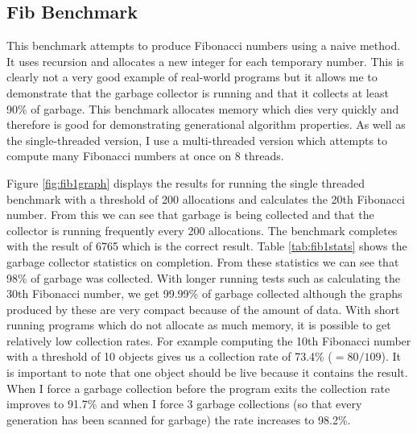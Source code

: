 \documentclass[../diss.tex]{subfiles}
\begin{document}
\subsection{Fib Benchmark}

This benchmark attempts to produce Fibonacci numbers using a naive method. It uses recursion and allocates a new integer for each temporary number. This is clearly not a very good example of real-world programs but it allows me to demonstrate that the garbage collector is running and that it collects at least 90\% of garbage. This benchmark allocates memory which dies very quickly and therefore is good for demonstrating generational algorithm properties. As well as the single-threaded version, I use a multi-threaded version which attempts to compute many Fibonacci numbers at once on 8 threads.

Figure \ref{fig:fib1graph} displays the results for running the single threaded benchmark with a threshold of 200 allocations and calculates the 20th Fibonacci number. From this we can see that garbage is being collected and that the collector is running frequently every 200 allocations. The benchmark completes with the result of 6765 which is the correct result. Table \ref{tab:fib1stats} shows the garbage collector statistics on completion. From these statistics we can see that 98\% of garbage was collected. With longer running tests such as calculating the 30th Fibonacci number, we get 99.99\% of garbage collected although the graphs produced by these are very compact because of the amount of data. With short running programs which do not allocate as much memory, it is possible to get relatively low collection rates. For example computing the 10th Fibonacci number with a threshold of 10 objects gives us a collection rate of 73.4\% ($=80/109$). It is important to note that one object should be live because it contains the result. When I force a garbage collection before the program exits the collection rate improves to 91.7\% and when I force 3 garbage collections (so that every generation has been scanned for garbage) the rate increases to 98.2\%.
\end{document}
